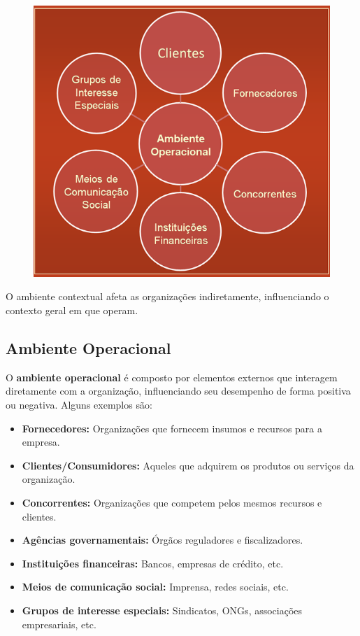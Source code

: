 \begin{figure}[H]  %
    \centering
    \begin{minipage}{0.6\textwidth}
        \centering
        \includegraphics[width=\textwidth]{img/imagem4.png}
        
        \label{fig:exemplo}
    \end{minipage}
\end{figure}


O ambiente contextual afeta as organizações indiretamente, influenciando o contexto geral em que operam.

\subsection{Ambiente Operacional}

O \textbf{ambiente operacional} é composto por elementos externos que interagem diretamente com a organização, influenciando seu desempenho de forma positiva ou negativa. Alguns exemplos são:

\begin{itemize}
    \item \textbf{Fornecedores:} Organizações que fornecem insumos e recursos para a empresa.
    \item \textbf{Clientes/Consumidores:} Aqueles que adquirem os produtos ou serviços da organização.
    \item \textbf{Concorrentes:} Organizações que competem pelos mesmos recursos e clientes.
    \item \textbf{Agências governamentais:} Órgãos reguladores e fiscalizadores.
    \item \textbf{Instituições financeiras:} Bancos, empresas de crédito, etc.
    \item \textbf{Meios de comunicação social:} Imprensa, redes sociais, etc.
    \item \textbf{Grupos de interesse especiais:} Sindicatos, ONGs, associações empresariais, etc.
\end{itemize}



